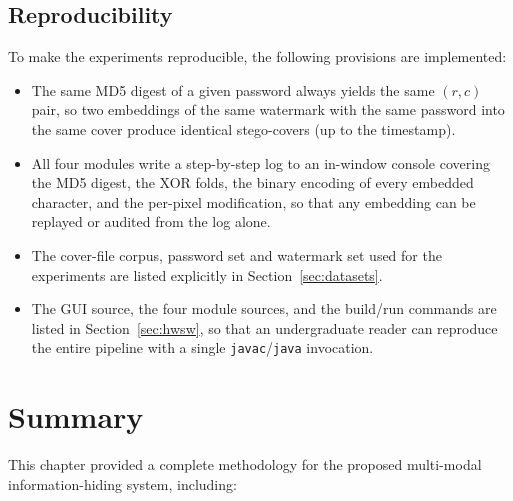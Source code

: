 \subsection{Reproducibility}

To make the experiments reproducible, the following provisions are implemented:

\begin{itemize}
    \item The same MD5 digest of a given password always yields the same $(r, c)$ pair, so two embeddings of the same watermark with the same password into the same cover produce identical stego-covers (up to the timestamp).
    \item All four modules write a step-by-step log to an in-window console covering the MD5 digest, the XOR folds, the binary encoding of every embedded character, and the per-pixel modification, so that any embedding can be replayed or audited from the log alone.
    \item The cover-file corpus, password set and watermark set used for the experiments are listed explicitly in Section~\ref{sec:datasets}.
    \item The GUI source, the four module sources, and the build/run commands are listed in Section~\ref{sec:hwsw}, so that an undergraduate reader can reproduce the entire pipeline with a single \texttt{javac}/\texttt{java} invocation.
\end{itemize}

\section{Summary}
\label{sec:methodology_summary}

This chapter provided a complete methodology for the proposed multi-modal information-hiding system, including:

